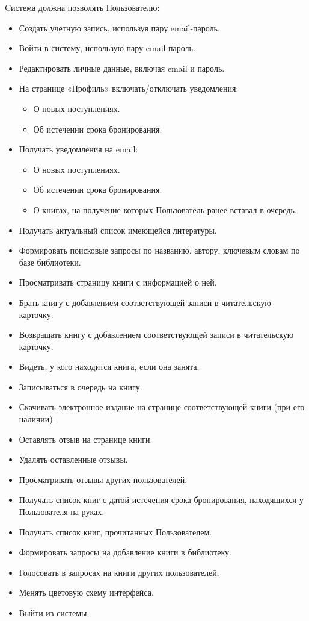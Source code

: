 \documentclass[../Отчет.tex]{subfiles}
\begin{document}
\par
Cистема должна позволять Пользователю:
\begin{itemize}
    \item Создать учетную запись, используя пару email-пароль.
    \item Войти в систему, использую пару email-пароль.
    \item Редактировать личные данные, включая email и пароль.
    \item На странице «Профиль» включать/отключать уведомления:
    \begin{itemize}
        \item О новых поступлениях.
        \item Об истечении срока бронирования.
    \end{itemize}
    \item Получать уведомления на email:
    \begin{itemize}
        \item О новых поступлениях.
        \item Об истечении срока бронирования.
        \item О книгах, на получение которых Пользователь ранее вставал в очередь.
    \end{itemize}
    \item Получать актуальный список имеющейся литературы.
    \item Формировать поисковые запросы по названию, автору, ключевым словам по базе библиотеки.
    \item Просматривать страницу книги с информацией о ней.
    \item Брать книгу с добавлением соответствующей записи в читательскую карточку.
    \item Возвращать книгу с добавлением соответствующей записи в читательскую карточку.
    \item Видеть, у кого находится книга, если она занята.
    \item Записываться в очередь на книгу.
    \item Скачивать электронное издание на странице соответствующей книги (при его наличии).
    \item Оставлять отзыв на странице книги.
    \item Удалять оставленные отзывы.
    \item Просматривать отзывы других пользователей.
    \item Получать список книг с датой истечения срока бронирования, находящихся у Пользователя на руках.
    \item Получать список книг, прочитанных Пользователем. 
    \item Формировать запросы на добавление книги в библиотеку.
    \item Голосовать в запросах на книги других пользователей.
    \item Менять цветовую схему интерфейса.
    \item Выйти из системы.
\end{itemize}
\end{document}
